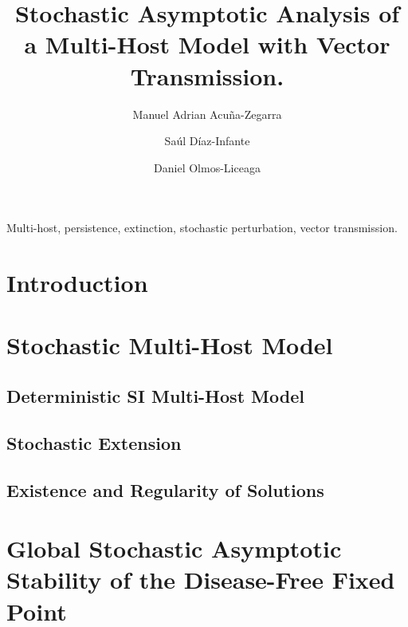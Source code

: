 \documentclass[3p,sort&compress]{elsarticle}
\DeclareRobustCommand{\1}[1]{\ensuremath \mathbbm{1}_{\{#1\}}}
\begin{document}
	\begin{frontmatter}
		\title{
			Stochastic Asymptotic 
			Analysis  of a Multi-Host 
			Model with Vector Transmission.
		}
		\author{Manuel Adrian Acu\~na-Zegarra}
		\address{Radarweg 29, Amsterdam}
%
		\author[mymainaddress,mysecondaryaddress]{Sa\'ul D\'iaz-Infante}
		\author[mysecondaryaddress]%
		{Daniel Olmos-Liceaga }
		\address[mymainaddress]{Universidad de Sonora, Hermosillo, Sonora, M\'exico}
		\address[mysecondaryaddress]{360 Park Avenue South, New York}
		\begin{abstract}
			
		\end{abstract}
		\begin{keyword}
			Multi-host, persistence, extinction, stochastic perturbation,
			vector transmission.
		\end{keyword}
	\end{frontmatter}
	\linenumbers
	\section{Introduction}
		
	\section{Stochastic Multi-Host Model}
		\subsection{Deterministic SI Multi-Host Model}
			
		\subsection{Stochastic Extension}
			\label{sec:sto_ext}
			
				\subsection{Existence and Regularity of Solutions}
				
	\section{
		Global Stochastic Asymptotic Stability of the Disease-Free Fixed Point
	}
		
\end{document}
